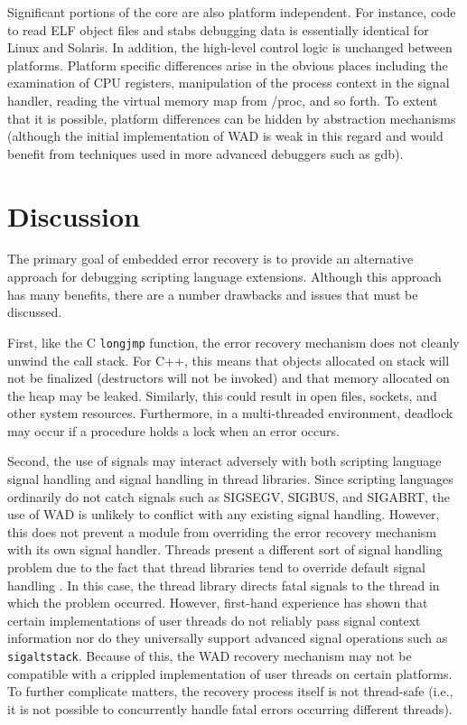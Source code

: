 Significant portions of the core are also platform independent.  For
instance, code to read ELF object files and stabs debugging data is
essentially identical for Linux and Solaris.  In addition, the
high-level control logic is unchanged between platforms.  Platform
specific differences arise in the obvious places including the
examination of CPU registers, manipulation of the process context in
the signal handler, reading the virtual memory map from /proc, and so
forth.  To extent that it is possible, platform differences
can be hidden by abstraction mechanisms (although the initial
implementation of WAD is weak in this regard and would benefit from
techniques used in more advanced debuggers such as gdb). 

\section{Discussion}

The primary goal of embedded error recovery is to provide an
alternative approach for debugging scripting language extensions.
Although this approach has many benefits, there are a number
drawbacks and issues that must be discussed.

First, like the C {\tt longjmp} function, the error recovery mechanism
does not cleanly unwind the call stack.  For C++, this means that
objects allocated on stack will not be finalized (destructors will not
be invoked) and that memory allocated on the heap may be
leaked. Similarly, this could result in open files, sockets, and other
system resources. Furthermore, in a multi-threaded environment,
deadlock may occur if a procedure holds a lock when an error occurs.

Second, the use of signals may interact adversely with both scripting
language signal handling and signal handling in thread libraries.
Since scripting languages ordinarily do not catch signals such as
SIGSEGV, SIGBUS, and SIGABRT, the use of WAD is unlikely to conflict
with any existing signal handling. However, this does not prevent a
module from overriding the error recovery mechanism with its own
signal handler. Threads present a different sort of signal handling problem
due to the fact that thread libraries tend to override default signal handling \cite{thread}.
In this case, the thread library directs fatal signals to the thread in which the problem occurred.
However, first-hand experience has shown that certain implementations
of user threads do not reliably pass signal context information nor do
they universally support advanced signal operations such as {\tt
sigaltstack}.  Because of this, the WAD recovery mechanism may not be
compatible with a crippled implementation of user threads on certain
platforms.  To further complicate matters, the recovery process itself is
not thread-safe (i.e., it is not possible to concurrently handle fatal errors
occurring different threads).

